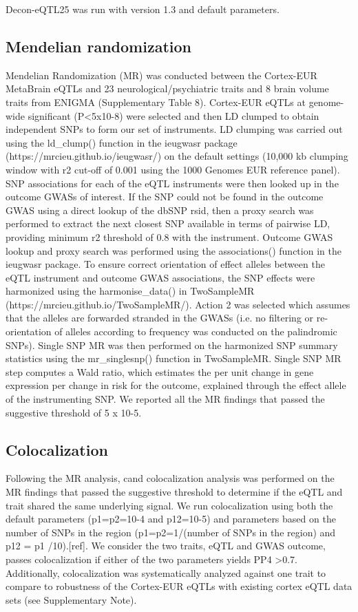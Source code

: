 Decon-eQTL25 was run with version 1.3 and default parameters. 

\subsection{Mendelian randomization}
Mendelian Randomization (MR) was conducted between the Cortex-EUR MetaBrain eQTLs and 23 neurological/psychiatric traits and 8 brain volume traits from ENIGMA (Supplementary Table 8). Cortex-EUR eQTLs at genome-wide significant (P<5x10-8) were selected and then LD clumped to obtain independent SNPs to form our set of instruments. LD clumping was carried out using the ld_clump() function in the ieugwasr package (https://mrcieu.github.io/ieugwasr/) on the default settings (10,000 kb clumping window with r2 cut-off of 0.001 using the 1000 Genomes EUR reference panel). SNP associations for each of the eQTL instruments were then looked up in the outcome GWASs of interest. If the SNP could not be found in the outcome GWAS using a direct lookup of the dbSNP rsid, then a proxy search was performed to extract the next closest SNP available in terms of pairwise LD, providing minimum r2 threshold of 0.8 with the instrument. Outcome GWAS lookup and proxy search was performed using the associations() function in the ieugwasr package. To ensure correct orientation of effect alleles between the eQTL instrument and outcome GWAS associations, the SNP effects were harmonized using the harmonise_data() in TwoSampleMR (https://mrcieu.github.io/TwoSampleMR/). Action 2 was selected which assumes that the alleles are forwarded stranded in the GWASs (i.e. no filtering or re-orientation of alleles according to frequency was conducted on the palindromic SNPs). Single SNP MR was then performed on the harmonized SNP summary statistics using the mr_singlesnp() function in TwoSampleMR. Single SNP MR step computes a Wald ratio, which estimates the per unit change in gene expression per change in risk for the outcome, explained through the effect allele of the instrumenting SNP. We reported all the MR findings that passed the suggestive threshold of 5 x 10-5. 

\subsection{Colocalization}
Following the MR analysis, cand colocalization analysis was performed on the MR findings that passed the suggestive threshold to determine if the eQTL and trait shared the same underlying signal. We run colocalization using both the default parameters (p1=p2=10-4 and p12=10-5) and parameters based on the number of SNPs in the region (p1=p2=1/(number of SNPs in the region) and p12 = p1 /10).[ref]. We consider the two traits, eQTL and GWAS outcome, passes colocalization if either of the two parameters yields PP4 >0.7. Additionally, colocalization was systematically analyzed against one trait to compare to robustness of the Cortex-EUR eQTLs with existing cortex eQTL data sets (see Supplementary Note). 

